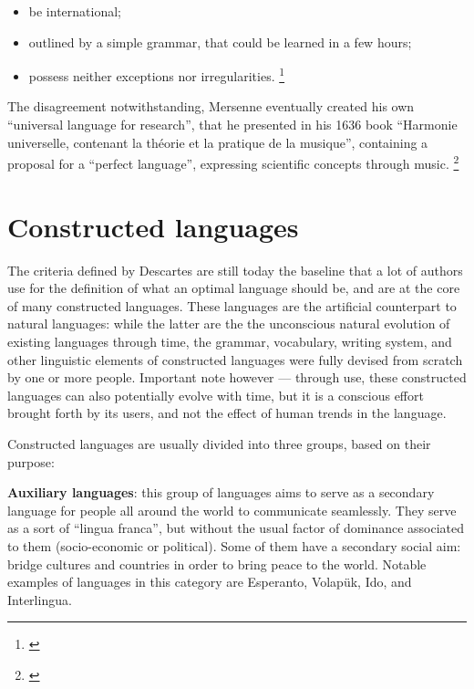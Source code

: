 \begin{itemize}
    \setlength\itemsep{-0.5em}
    \item be international;
    \item outlined by a simple grammar, that could be learned in a few hours;
    \item possess neither exceptions nor irregularities. \footnote{\cite[76-82]{descartes1897oeuvres}}
\end{itemize}

The disagreement notwithstanding, Mersenne eventually created his own ``universal language for research'', that he presented in his 1636 book
``Harmonie universelle, contenant la th{\'e}orie et la pratique de la musique'', containing a proposal for a ``perfect language'', expressing scientific
concepts through music. \footnote{\cite[Book I, proposition 24]{mersenne1636}}

\section{Constructed languages}

The criteria defined by Descartes are still today the baseline that a lot of authors use for the definition of what an optimal language should be, and are at the core of many
constructed languages. These languages are the artificial counterpart to natural languages: while the latter are the the unconscious natural evolution of existing languages through
time, the grammar, vocabulary, writing system, and other linguistic elements of constructed languages were fully devised from scratch by one or more people. Important note
however --- through use, these constructed languages can also potentially evolve with time, but it is a conscious effort brought forth by its users, and not the effect of human
trends in the language.\newline

Constructed languages are usually divided into three groups, based on their purpose:\newline

\textbf{Auxiliary languages}: this group of languages aims to serve as a secondary language for people all around the world to communicate seamlessly.
They serve as a sort of ``lingua franca'', but without the usual factor of dominance associated to them (socio-economic or political). Some of them have a secondary social aim:
bridge cultures and countries in order to bring peace to the world. Notable examples of languages in this category are Esperanto, Volapük, Ido, and Interlingua.\newline

